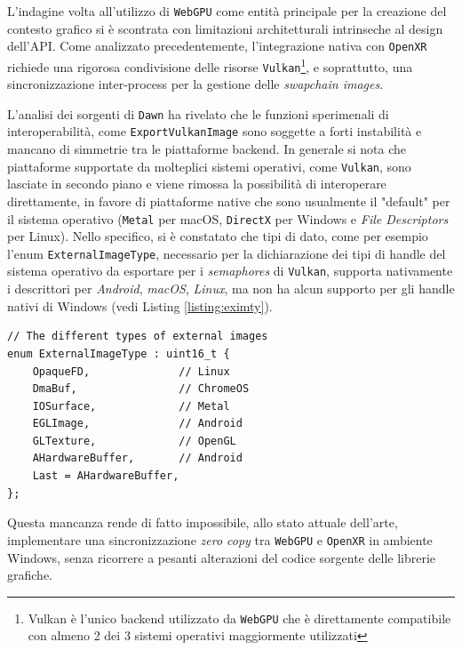 \documentclass[a4paper, 11pt, twoside]{report}
\begin{document}
L'indagine volta all'utilizzo di \texttt{WebGPU} come entità principale per la creazione del contesto grafico si è
scontrata con limitazioni architetturali intrinseche al design dell'API. Come analizzato precedentemente, l'integrazione
nativa con \texttt{\gls{OpenXR}} richiede una rigorosa condivisione delle risorse \texttt{\gls{Vulkan}}\footnote{Vulkan
è l'unico backend utilizzato da \texttt{WebGPU} che è direttamente compatibile con almeno 2 dei 3 sistemi operativi
maggiormente utilizzati}, e soprattutto, una sincronizzazione inter-process per la gestione delle \textit{swapchain
images}.

L'analisi dei sorgenti di \texttt{Dawn} ha rivelato che le funzioni sperimenali di interoperabilità, come
\texttt{ExportVulkanImage} sono soggette a forti instabilità e mancano di simmetrie tra le piattaforme backend.
In generale si nota che piattaforme supportate da molteplici sistemi operativi, come \texttt{\gls{Vulkan}}, sono
lasciate in secondo piano e viene rimossa la possibilità di interoperare direttamente, in favore di piattaforme native
che sono usualmente il "default" per il sistema operativo (\texttt{\gls{Metal}} per macOS, \texttt{\gls{DirectX}} per
Windows e \textit{File Descriptors} per Linux).
Nello specifico, si è constatato che tipi di dato, come per esempio l'enum \texttt{ExternalImageType}, necessario
per la dichiarazione dei tipi di handle del sistema operativo da esportare per i \textit{semaphores} di
\texttt{\gls{Vulkan}}, supporta nativamente i descrittori per \textit{Android}, \textit{macOS}, \textit{Linux}, ma non
ha alcun supporto per gli handle nativi di Windows (vedi Listing \ref{listing:eximty}).

\begin{listing}[!ht]
\begin{verbatim}
// The different types of external images
enum ExternalImageType : uint16_t {
    OpaqueFD,              // Linux
    DmaBuf,                // ChromeOS
    IOSurface,             // Metal
    EGLImage,              // Android
    GLTexture,             // OpenGL
    AHardwareBuffer,       // Android
    Last = AHardwareBuffer,
};
\end{verbatim}
\vspace{-0.75cm}
\caption{Enumerativo \texttt{ExternalImageType}}
\label{listing:eximty}
\end{listing}

Questa mancanza rende di fatto impossibile, allo stato attuale dell'arte, implementare una sincronizzazione \textit{zero
copy} tra \texttt{WebGPU} e \texttt{\gls{OpenXR}} in ambiente Windows, senza ricorrere a pesanti alterazioni del codice
sorgente delle librerie grafiche.
\end{document}
